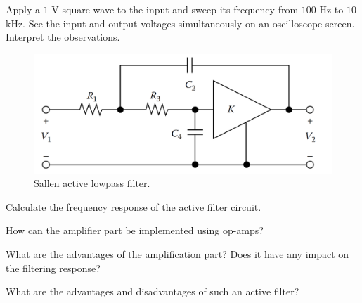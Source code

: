 \documentclass[11pt]{article}
\begin{document}
\begin{question}
\begin{subquestion}{Apply a $1$-V square wave to the input and sweep its frequency from $100$ Hz to $10$ kHz. See the input and output voltages simultaneously on an oscilloscope screen. Interpret the observations.} 
\answer{}
\end{subquestion}

\end{question}




\begin{question}


\begin{figure}[H] 
\begin{center}
\includegraphics[scale=0.3]{Fig/Q5.png}
\caption{\label{fig:Q5} Sallen active lowpass filter.}
\end{center}
\end{figure}  

\begin{subquestion}{Calculate the frequency response of the active filter circuit.} 
\answer{}
\end{subquestion}
\begin{subquestion}{How can the amplifier part be implemented using op-amps?} 
\answer{}
\end{subquestion}
\begin{subquestion}{What are the advantages of the amplification part? Does it have any impact on the filtering response?} 
\answer{}
\end{subquestion}
\begin{subquestion}{What are the advantages and disadvantages of such an active filter?} 
\answer{}
\end{subquestion}

\end{question}
\end{document}
